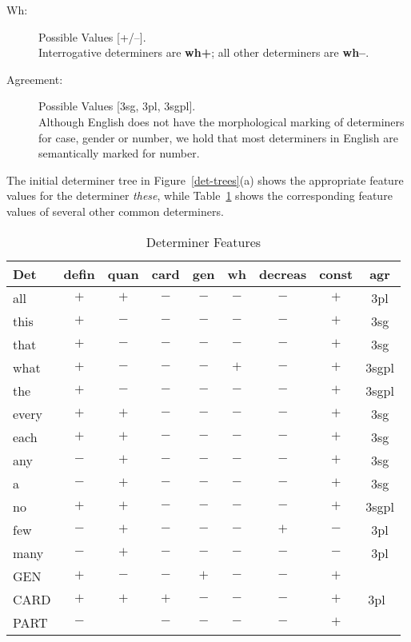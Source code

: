\begin{description}
\item[Wh:]  Possible Values [+/--]. \\
Interrogative determiners are {\bf wh+}; all other determiners are
{\bf wh--}. 

\item[Agreement:] Possible Values [3sg, 3pl, 3sgpl]. \\
Although English does not have the morphological marking of determiners for
case, gender or number, we hold that most determiners in English are
semantically marked for number.

\end{description}

The initial determiner tree in Figure~\ref{det-trees}(a) shows the appropriate
feature values for the determiner {\it these}, while Table~\ref{det-values}
shows the corresponding feature values of several other common determiners.

\begin{table}[hbt]
\centering
\begin{tabular}{|l||c|c|c|c|c|c|c|c|}
\hline
Det&defin&quan&card&gen&wh&decreas&const&agr\\
\hline
\hline
all&$+$&$+$&$-$&$-$&$-$&$-$&$+$&3pl\\
this&$+$&$-$&$-$&$-$&$-$&$-$&$+$&3sg\\
that&$+$&$-$&$-$&$-$&$-$&$-$&$+$&3sg\\
what&$+$&$-$&$-$&$-$&$+$&$-$&$+$&3sgpl\\
the&$+$&$-$&$-$&$-$&$-$&$-$&$+$&3sgpl\\
every&$+$&$+$&$-$&$-$&$-$&$-$&$+$&3sg\\
each&$+$&$+$&$-$&$-$&$-$&$-$&$+$&3sg\\
any&$-$&$+$&$-$&$-$&$-$&$-$&$+$&3sg\\
a&$-$&$+$&$-$&$-$&$-$&$-$&$+$&3sg\\
no&$+$&$+$&$-$&$-$&$-$&$-$&$+$&3sgpl\\
few&$-$&$+$&$-$&$-$&$-$&$+$&$-$&3pl\\
many&$-$&$+$&$-$&$-$&$-$&$-$&$-$&3pl\\
GEN&$+$&$-$&$-$&$+$&$-$&$-$&$+$&\\
CARD&$+$&$+$&$+$&$-$&$-$&$-$&$+$&3pl\footnotemark\ \\
PART&$-$&&$-$&$-$&$-$&$-$&$+$&\\
\hline
\end{tabular}
 \caption{Determiner Features}
\label{det-values}
\end{table}\addtocounter{footnote}{0} 

